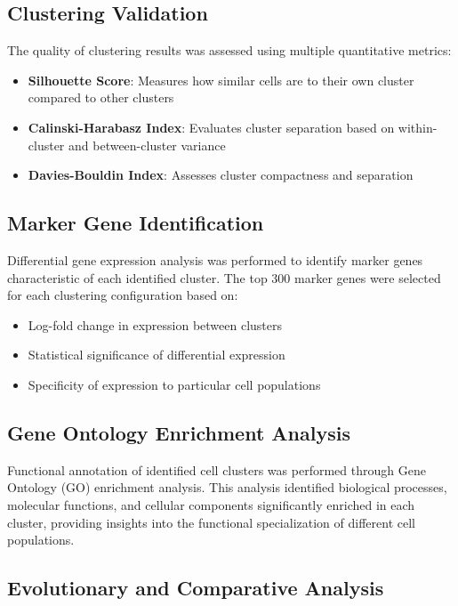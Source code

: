 \documentclass[12pt,a4paper]{article}
\begin{document}
\subsection{Clustering Validation}

The quality of clustering results was assessed using multiple quantitative metrics:

\begin{itemize}
\item \textbf{Silhouette Score}: Measures how similar cells are to their own cluster compared to other clusters
\item \textbf{Calinski-Harabasz Index}: Evaluates cluster separation based on within-cluster and between-cluster variance
\item \textbf{Davies-Bouldin Index}: Assesses cluster compactness and separation
\end{itemize}

\subsection{Marker Gene Identification}

Differential gene expression analysis was performed to identify marker genes characteristic of each identified cluster. The top 300 marker genes were selected for each clustering configuration based on:

\begin{itemize}
\item Log-fold change in expression between clusters
\item Statistical significance of differential expression
\item Specificity of expression to particular cell populations
\end{itemize}

\subsection{Gene Ontology Enrichment Analysis}

Functional annotation of identified cell clusters was performed through Gene Ontology (GO) enrichment analysis. This analysis identified biological processes, molecular functions, and cellular components significantly enriched in each cluster, providing insights into the functional specialization of different cell populations.

\subsection{Evolutionary and Comparative Analysis}
\end{document}
